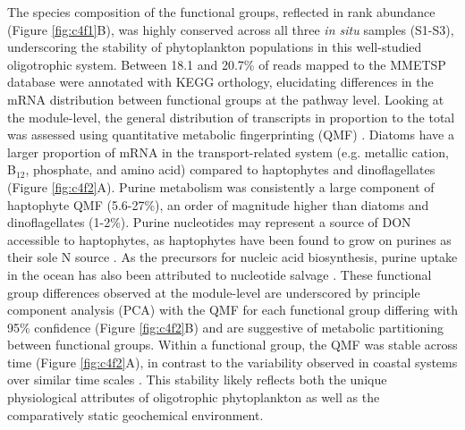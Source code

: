 The species composition of the functional groups, reflected in rank abundance (Figure \ref{fig:c4f1}B), was highly conserved across all three \textit{in situ} samples (S1-S3), underscoring the stability of phytoplankton populations in this well-studied oligotrophic system. Between 18.1 and 20.7\% of reads mapped to the MMETSP database were annotated with KEGG orthology, elucidating differences in the mRNA distribution between functional groups at the pathway level. Looking at the module-level, the general distribution of transcripts in proportion to the total was assessed using quantitative metabolic fingerprinting (QMF) \citep{Alexander2015}. Diatoms have a larger proportion of mRNA in the transport-related system (e.g. metallic cation, B$_12$, phosphate, and amino acid) compared to haptophytes and dinoflagellates (Figure \ref{fig:c4f2}A). Purine metabolism was consistently a large component of haptophyte QMF (5.6-27\%), an order of magnitude higher than diatoms and dinoflagellates (1-2\%). Purine nucleotides may represent a source of DON accessible to haptophytes, as haptophytes have been found to grow on purines as their sole N source \citep{Palenik1997}. As the precursors for nucleic acid biosynthesis, purine uptake in the ocean has also been attributed to nucleotide salvage \citep{Winn1984}. These functional group differences observed at the module-level are underscored by principle component analysis (PCA) with the QMF for each functional group differing with 95\% confidence (Figure \ref{fig:c4f2}B) and are suggestive of metabolic partitioning between functional groups. Within a functional group, the QMF was stable across time (Figure \ref{fig:c4f2}A), in contrast to the variability observed in coastal systems over similar time scales \citep{Alexander2015, Dupont2015}. This stability likely reflects both the unique physiological attributes of oligotrophic phytoplankton as well as the comparatively static geochemical environment. \par


